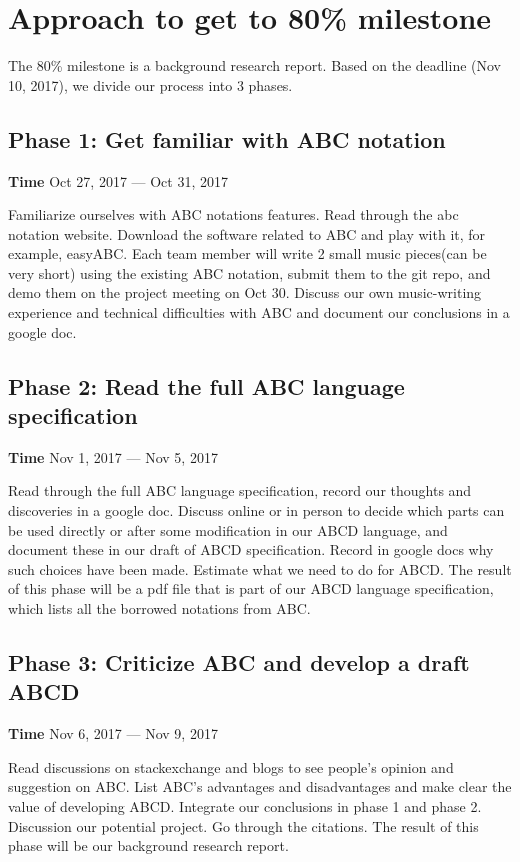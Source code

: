 \section{Approach to get to 80\% milestone}
The 80\% milestone is a background research report. Based on the deadline (Nov 10, 2017), we divide our process into 3 phases.

\subsection{Phase 1: Get familiar with ABC notation}
\textbf{Time} Oct 27, 2017 --- Oct 31, 2017

\noindent Familiarize ourselves with ABC notations features. Read through the abc notation website. Download the software related to ABC and play with it, for example, easyABC. Each team member will write 2 small music pieces(can be very short) using the existing ABC notation, submit them to the git repo, and demo them on the project meeting on Oct 30. Discuss our own music-writing experience and technical difficulties with ABC and document our conclusions in a google doc.

\subsection{Phase 2: Read the full ABC language specification}
\textbf{Time} Nov 1, 2017 --- Nov 5, 2017

\noindent Read through the full ABC language specification, record our thoughts and discoveries in a google doc. Discuss online or in person to decide which parts can be used directly or after some modification in our ABCD language, and document these in our draft of ABCD specification. Record in google docs why such choices have been made. Estimate what we need to do for ABCD. The result of this phase will be a pdf file that is part of our ABCD language specification, which lists all the borrowed notations from ABC.

\subsection{Phase 3: Criticize ABC and develop a draft ABCD}
\textbf{Time} Nov 6, 2017 --- Nov 9, 2017

\noindent Read discussions on stackexchange and blogs to see people's opinion and suggestion on ABC. List ABC's advantages and disadvantages and make clear the value of developing ABCD. Integrate our conclusions in phase 1 and phase 2. Discussion our potential project. Go through the citations. The result of this phase will be our background research report.

